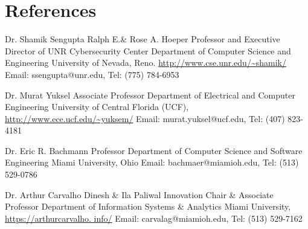 \documentclass[11pt,letterpaper,sans]{moderncv}   %
\begin{document}
\section{References}
	{Dr. Shamik Sengupta}
	{Ralph E.\& Rose A. Hoeper Professor and Executive Director of UNR Cybersecurity Center}
	{ Department of Computer Science and Engineering} 
	{University of Nevada, Reno. \url{http://www.cse.unr.edu/~shamik/}}
	{Email: ssengupta@unr.edu, Tel: (775) 784-6953}

	{Dr. Murat Yuksel}
	{Associate Professor} 
	{Department of Electrical and Computer Engineering} 
	{University of Central Florida (UCF), \url{http://www.ece.ucf.edu/~yuksem/}}
	{Email: murat.yuksel@ucf.edu, Tel: (407) 823-4181}
	
	{Dr. Eric R. Bachmann}
	{ Professor} 
	{Department of Computer Science and Software Engineering}
	{Miami University, Ohio}
	{Email: bachmaer@miamioh.edu, Tel: (513) 529-0786}
	
	{Dr. Arthur Carvalho} 
	{Dinesh \& Ila Paliwal Innovation Chair \& Associate Professor} 
	{Department of Information Systems \& Analytics}
	{Miami University, \url{https://arthurcarvalho. info/}}
	{Email: carvalag@miamioh.edu, Tel: (513) 529-7162}
\end{document}
